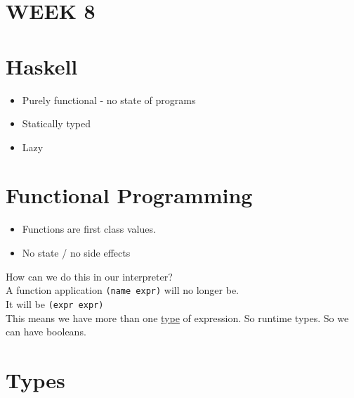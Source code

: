 \documentclass{article}
\begin{document}
\begin{flushleft}
 \section*{WEEK 8}
 \section*{Haskell}
\begin{itemize}
 \item Purely functional - no state of programs
 \item Statically typed
 \item Lazy
\end{itemize}

\section*{Functional Programming}
\begin{itemize}
 \item Functions are first class values.
 \item No state / no side effects
\end{itemize}
\begin{flushleft}
 How can we do this in our interpreter?\\
 A function application \verb|(name expr)| will no longer be.\\
 It will be \verb|(expr expr)|\\
 This means we have more than one \underline{type} of expression. So runtime types. So we can have booleans.
\end{flushleft}
\section{Types}

\end{flushleft}
\end{document}
